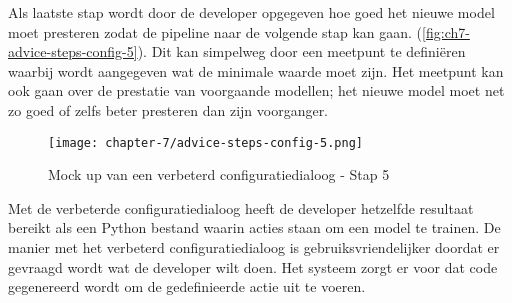 Als laatste stap wordt door de developer opgegeven hoe goed het nieuwe model moet presteren zodat de pipeline naar de volgende stap kan gaan. (\autoref{fig:ch7-advice-steps-config-5}). Dit kan simpelweg door een meetpunt te definiëren waarbij wordt aangegeven wat de minimale waarde moet zijn. Het meetpunt kan ook gaan over de prestatie van voorgaande modellen; het nieuwe model moet net zo goed of zelfs beter presteren dan zijn voorganger.

\newpage

\begin{figure}[hbt!]
  \centering
  \texttt{[image: chapter-7/advice-steps-config-5.png]}
  \caption{Mock up van een verbeterd configuratiedialoog - Stap 5}
  \label{fig:ch7-advice-steps-config-5}
\end{figure}

Met de verbeterde configuratiedialoog heeft de developer hetzelfde resultaat bereikt als een Python bestand waarin acties staan om een model te trainen. De manier met het verbeterd configuratiedialoog is gebruiksvriendelijker doordat er gevraagd wordt wat de developer wilt doen. Het systeem zorgt er voor dat code gegenereerd wordt om de gedefinieerde actie uit te voeren.


